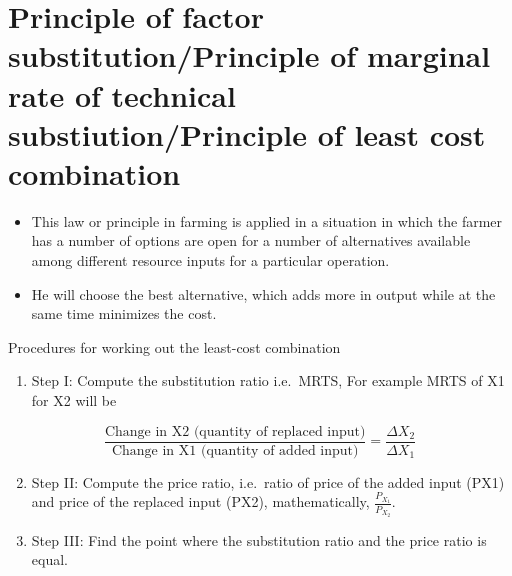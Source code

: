 \documentclass[12pt,ignorenonframetext,aspectratio=169]{beamer}
\providecommand{\tightlist}{%
  \setlength{\itemsep}{0pt}\setlength{\parskip}{0pt}}
\begin{document}
\hypertarget{principle-of-factor-substitutionprinciple-of-marginal-rate-of-technical-substiutionprinciple-of-least-cost-combination}{%
\section{Principle of factor substitution/Principle of marginal rate of
technical substiution/Principle of least cost
combination}\label{principle-of-factor-substitutionprinciple-of-marginal-rate-of-technical-substiutionprinciple-of-least-cost-combination}}

\begin{frame}{}
\protect\hypertarget{section-3}{}
\begin{itemize}
\tightlist
\item
  This law or principle in farming is applied in a situation in which
  the farmer has a number of options are open for a number of
  alternatives available among different resource inputs for a
  particular operation.
\item
  He will choose the best alternative, which adds more in output while
  at the same time minimizes the cost.
\end{itemize}
\end{frame}

\begin{frame}{Procedures for working out the least-cost combination}
\protect\hypertarget{procedures-for-working-out-the-least-cost-combination}{}
\begin{enumerate}
\tightlist
\item
  Step I: Compute the substitution ratio i.e.~MRTS, For example MRTS of
  X1 for X2 will be
\end{enumerate}

\[\frac{\textrm{Change in X2 (quantity of replaced input)}}{ \textrm{Change in X1 (quantity of added input)}} = \frac{\Delta X_2}{\Delta X_1}\]

\begin{enumerate}
\setcounter{enumi}{1}
\item
  Step II: Compute the price ratio, i.e.~ratio of price of the added
  input (PX1) and price of the replaced input (PX2), mathematically,
  \(\frac{P_{X_1}}{P_{X_2}}\).
\item
  Step III: Find the point where the substitution ratio and the price
  ratio is equal.
\end{enumerate}
\end{frame}
\end{document}
